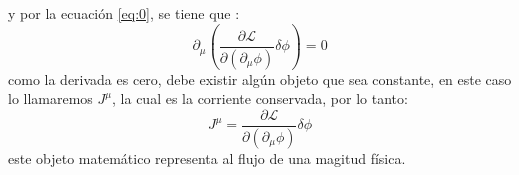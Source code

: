 \documentclass[12pt,letterpaper]{report}
\begin{document}
y por la ecuación \ref{eq:0}, se tiene que :
\begin{equation}
    \label{eq:delta}
    \partial_\mu \left(\frac{\partial \mathcal{L}}{\partial(\partial_\mu \phi)} \delta \phi \right) = 0
\end{equation}
como la derivada es cero, debe existir algún objeto que sea constante, en este caso lo llamaremos $J^{\mu}$, la cual es la corriente conservada, por lo tanto:
\begin{equation}
    J^{\mu}=\frac{\partial \mathcal{L}}{\partial(\partial_\mu \phi)} \delta \phi
\end{equation}
este objeto matemático representa al flujo de una magitud física.
\end{document}
